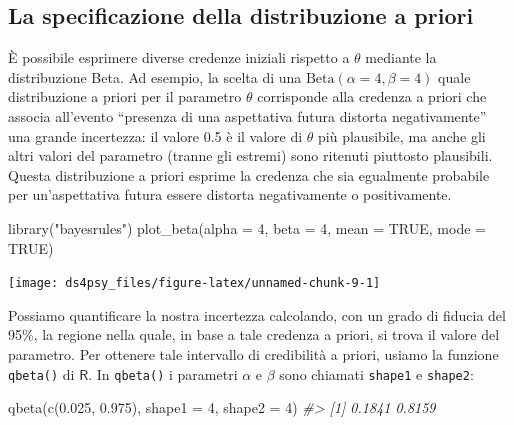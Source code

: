 \documentclass[
  11pt,
]{krantz}
\makeatletter
\newenvironment{Shaded}{\begin{snugshade}}{\end{snugshade}}
\newcommand{\AttributeTok}[1]{\textcolor[rgb]{0.61,0.61,0.61}{#1}}
\newcommand{\CommentTok}[1]{\textcolor[rgb]{0.37,0.37,0.37}{\textit{#1}}}
\newcommand{\ConstantTok}[1]{\textcolor[rgb]{0,0,0}{#1}}
\newcommand{\DecValTok}[1]{\textcolor[rgb]{0.06,0.06,0.06}{#1}}
\newcommand{\FloatTok}[1]{\textcolor[rgb]{0.06,0.06,0.06}{#1}}
\newcommand{\FunctionTok}[1]{\textcolor[rgb]{0,0,0}{#1}}
\newcommand{\NormalTok}[1]{#1}
\newcommand{\StringTok}[1]{\textcolor[rgb]{0.5,0.5,0.5}{#1}}
\newenvironment{kframe}{%
\medskip{}
\setlength{\fboxsep}{.8em}
 \def\at@end@of@kframe{}%
 \ifinner\ifhmode%
  \def\at@end@of@kframe{\end{minipage}}%
  \begin{minipage}{\columnwidth}%
 \fi\fi%
 \def\FrameCommand##1{\hskip\@totalleftmargin \hskip-\fboxsep
 \colorbox{shadecolor}{##1}\hskip-\fboxsep
     \hskip-\linewidth \hskip-\@totalleftmargin \hskip\columnwidth}%
 \MakeFramed {\advance\hsize-\width
   \@totalleftmargin\z@ \linewidth\hsize
   \@setminipage}}%
 {\par\unskip\endMakeFramed%
 \at@end@of@kframe}
\renewenvironment{Shaded}{\begin{kframe}}{\end{kframe}}
\newcommand{\R}{\textsf{R}} %
\theoremstyle{definition}
\theoremstyle{definition}
\theoremstyle{definition}
\theoremstyle{definition}
\theoremstyle{remark}
\makeatother
\begin{document}
\hypertarget{la-specificazione-della-distribuzione-a-priori}{%
\subsection{La specificazione della distribuzione a priori}\label{la-specificazione-della-distribuzione-a-priori}}

È possibile esprimere diverse credenze iniziali rispetto a \(\theta\) mediante la distribuzione Beta. Ad esempio, la scelta di una \(\mbox{Beta}(\alpha = 4, \beta = 4)\) quale distribuzione a priori per il parametro \(\theta\) corrisponde alla credenza a priori che associa all'evento ``presenza di una aspettativa futura distorta negativamente'' una grande incertezza: il valore 0.5 è il valore di \(\theta\) più plausibile, ma anche gli altri valori del parametro (tranne gli estremi) sono ritenuti piuttosto plausibili. Questa distribuzione a priori esprime la credenza che sia egualmente probabile per un'aspettativa futura essere distorta negativamente o positivamente.

\begin{Shaded}
\begin{Highlighting}[]
\FunctionTok{library}\NormalTok{(}\StringTok{"bayesrules"}\NormalTok{)}
\FunctionTok{plot\_beta}\NormalTok{(}\AttributeTok{alpha =} \DecValTok{4}\NormalTok{, }\AttributeTok{beta =} \DecValTok{4}\NormalTok{, }\AttributeTok{mean =} \ConstantTok{TRUE}\NormalTok{, }\AttributeTok{mode =} \ConstantTok{TRUE}\NormalTok{)}
\end{Highlighting}
\end{Shaded}

\begin{center}\texttt{[image: ds4psy\_files/figure-latex/unnamed-chunk-9-1]} \end{center}

Possiamo quantificare la nostra incertezza calcolando, con un grado di fiducia del 95\%, la regione nella quale, in base a tale credenza a priori, si trova il valore del parametro. Per ottenere tale intervallo di credibilità a priori, usiamo la funzione \texttt{qbeta()} di \(\R\). In \texttt{qbeta()} i parametri \(\alpha\) e \(\beta\) sono chiamati \texttt{shape1} e \texttt{shape2}:

\begin{Shaded}
\begin{Highlighting}[]
\FunctionTok{qbeta}\NormalTok{(}\FunctionTok{c}\NormalTok{(}\FloatTok{0.025}\NormalTok{, }\FloatTok{0.975}\NormalTok{), }\AttributeTok{shape1 =} \DecValTok{4}\NormalTok{, }\AttributeTok{shape2 =} \DecValTok{4}\NormalTok{)}
\CommentTok{\#\textgreater{} [1] 0.1841 0.8159}
\end{Highlighting}
\end{Shaded}
\end{document}
